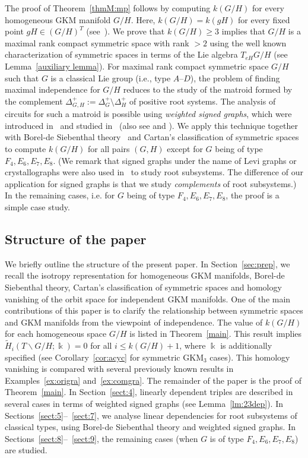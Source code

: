 \documentclass{amsart}
\theoremstyle{definition}
\theoremstyle{remark}
\numberwithin{equation}{section}
\begin{document}
The proof of Theorem~\ref{thmM:mp} follows by computing $k(G/H)$ for every homogeneous GKM manifold $G/H$.
Here, $k(G/H)=k(gH)$ for every fixed point $gH\in (G/H)^{T}$ (see~\cite{GHZ}).
We prove that $k(G/H)\geq 3$ implies that $G/H$ is a maximal rank compact symmetric space with rank $>2$ using the well known characterization of symmetric spaces in terms of the Lie algebra $T_{eH} G/H$ (see Lemma~\ref{auxiliary lemma}).
For maximal rank compact symmetric space $G/H$ such that $G$ is a classical Lie group (i.e., type $A$--$D$), the problem of finding maximal independence for $G/H$ reduces to the study of the matroid formed by the complement $\Delta^{+}_{G,H}:=\Delta^{+}_{G}\setminus \Delta^{+}_{H}$ of positive root systems.
The analysis of circuits for such a matroid is possible using {\it weighted signed graphs}, which were introduced in~\cite{Ha} and studied in~\cite{Za} (also see \cite{FGLP} and \cite{FGGP}).
We apply this technique together with Borel-de Siebenthal theory~\cite{BoSi} and Cartan's classification of symmetric spaces \cite{C27} to compute $k(G/H)$ for all pairs $(G,H)$ except for $G$ being of type $F_{4},E_{6},E_{7},E_{8}$.
(We remark that signed graphs under the name of Levi graphs or crystallographs were also used in~\cite{Re} to study root subsystems.
The difference of our application for signed graphs is that we study \textit{complements} of root subsystems.)
In the remaining cases, i.e. for $G$ being of type $F_{4},E_{6},E_{7},E_{8}$, the proof is a simple case study.

\subsection{Structure of the paper}
\label{sect:1.3}

We briefly outline the structure of the present paper.
In Section~\ref{sec:prep}, we recall the isotropy representation for homogeneous GKM manifolds, Borel-de Siebenthal theory, Cartan's classification of symmetric spaces and homology vanishing of the orbit space for independent GKM manifolds. 
One of the main contributions of this paper is to clarify the relationship between symmetric spaces and GKM manifolds from the viewpoint of independence.
The value of $k(G/H)$ for each homogeneous space $G/H$ is listed in Theorem~\ref{main}. 
This result implies $\widetilde{H}_{i}(T\backslash G/H;\Bbbk)=0$ for all $i\leq k(G/H)+1$, where $\Bbbk$ is additionally specified (see Corollary~\ref{cor:acyc} for symmetric GKM$_{3}$ cases).
This homology vanishing is compared with several previously known results in Examples~\ref{ex:origra} and~\ref{ex:comgra}.
The remainder of the paper is the proof of Theorem~\ref{main}.
In Section~\ref{sect:4}, linearly dependent triples are described in several cases in terms of weighted signed graphs (see Lemma~\ref{lm:23dep}).
In Sections~\ref{sect:5}--~\ref{sect:7}, we analyse linear dependencies for root subsystems of classical types, using Borel-de Siebenthal theory and weighted signed graphs.
In Sections~\ref{sect:8}--~\ref{sect:9},
the remaining cases (when $G$ is of type $F_{4},E_{6},E_{7},E_{8}$) are studied. 
\end{document}
